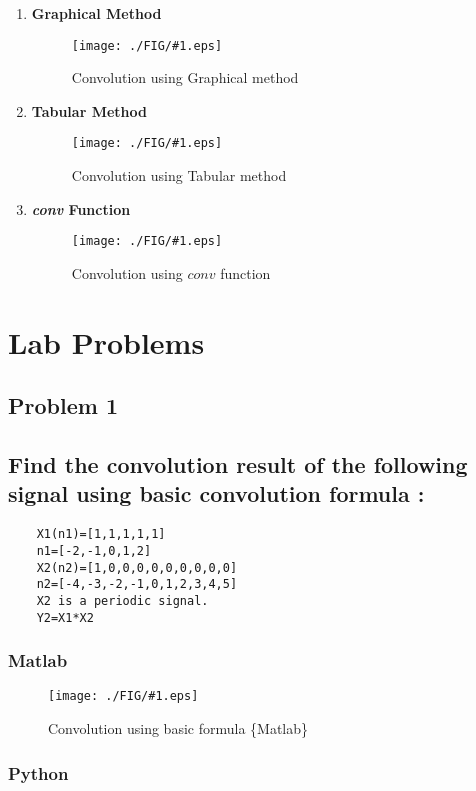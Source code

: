 \documentclass[a4paper,11pt]{article}
\newcommand{\mobs}[2]{
    \begin{figure}[H]
        \centering
        \texttt{[image: ./FIG/\#1.eps]}
        \caption{#2}
    \end{figure}
   
}
\begin{document}
\begin{enumerate}
    \item \textbf{Graphical Method}
          \mobs{graphical}{Convolution using Graphical method}
    \item \textbf{Tabular Method}
          \mobs{Tabular}{Convolution using Tabular method}
    \item \textbf{\textit{conv} Function}
          \mobs{conv_func}{Convolution using $conv$ function}

\end{enumerate}

\section {Lab Problems}


\subsection{Problem 1}
\subsection*{Find the convolution result of the following signal using basic convolution formula :}

\begin{verbatim}
    X1(n1)=[1,1,1,1,1]
    n1=[-2,-1,0,1,2]
    X2(n2)=[1,0,0,0,0,0,0,0,0,0]
    n2=[-4,-3,-2,-1,0,1,2,3,4,5]
    X2 is a periodic signal.
    Y2=X1*X2
\end{verbatim}

\subsubsection*{Matlab}

\mobs{p1}{Convolution using basic formula  \{Matlab\} }

\subsubsection*{Python}
\end{document}

